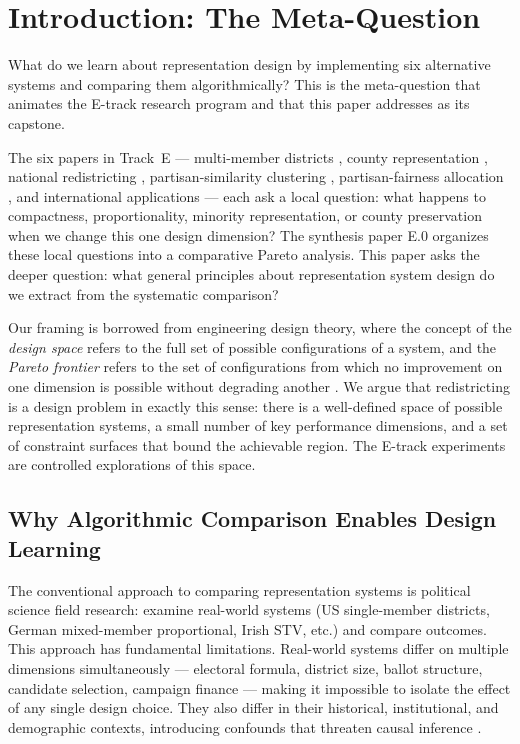 \section{Introduction: The Meta-Question}
\label{sec:intro}

What do we learn about representation design by implementing six alternative
systems and comparing them algorithmically?  This is the meta-question that
animates the E-track research program and that this paper addresses as its
capstone.

The six papers in Track~E --- multi-member districts \citep{dellaLibera2026e1},
county representation \citep{dellaLibera2026e2}, national redistricting
\citep{dellaLibera2026e3}, partisan-similarity clustering
\citep{dellaLibera2026e4}, partisan-fairness allocation \citep{dellaLibera2026e5},
and international applications \citep{dellaLibera2026e6} --- each ask a
local question: what happens to compactness, proportionality, minority
representation, or county preservation when we change this one design dimension?
The synthesis paper E.0 \citep{dellaLibera2026e0} organizes these local
questions into a comparative Pareto analysis.  This paper asks the deeper
question: what general principles about representation system design do we
extract from the systematic comparison?

Our framing is borrowed from engineering design theory, where the concept of
the \emph{design space} refers to the full set of possible configurations of a
system, and the \emph{Pareto frontier} refers to the set of configurations
from which no improvement on one dimension is possible without degrading
another \citep{simon1996sciences}.  We argue that redistricting is a design
problem in exactly this sense: there is a well-defined space of possible
representation systems, a small number of key performance dimensions, and a
set of constraint surfaces that bound the achievable region.  The E-track
experiments are controlled explorations of this space.

\subsection{Why Algorithmic Comparison Enables Design Learning}

The conventional approach to comparing representation systems is political
science field research: examine real-world systems (US single-member districts,
German mixed-member proportional, Irish STV, etc.) and compare outcomes.
This approach has fundamental limitations.  Real-world systems differ on
multiple dimensions simultaneously --- electoral formula, district size, ballot
structure, candidate selection, campaign finance --- making it impossible to
isolate the effect of any single design choice.  They also differ in their
historical, institutional, and demographic contexts, introducing confounds
that threaten causal inference \citep{lijphart1999patterns}.

